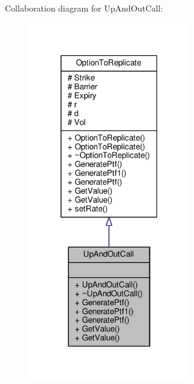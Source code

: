 Collaboration diagram for Up\+And\+Out\+Call\+:
\nopagebreak
\begin{figure}[H]
\begin{center}
\leavevmode
\includegraphics[width=199pt]{classUpAndOutCall__coll__graph}
\end{center}
\end{figure}
